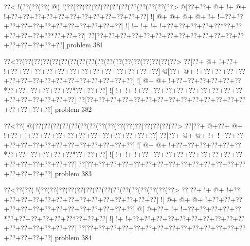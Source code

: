 \vbox{\vbox{\goo
\0??<\- !(\0??(\0??(\0??(\- @(\- !(\0??(\0??(\0??(\0??(\0??(\0??(\0??(\0??(\0??(\0??(\0??(\0??>
\- @[\0??+\0??+\- @+\- !+\- @+\- !+\0??+\0??+\0??+\0??+\0??+\0??+\0??+\0??+\0??+\0??+\0??+\0??]
\- ![\- @+\- @+\- @+\- @+\- !+\- !+\0??+\0??+\0??+\0??+\0??+\0??+\0??+\0??+\0??+\0??+\0??+\0??]
\- ![\- !+\- !+\- !+\- !+\0??+\0??+\0??+\0??+\0??*\0??+\0??+\0??+\0??+\0??+\0??*\0??+\0??+\0??]
\0??[\0??+\0??+\0??+\0??+\0??+\0??+\0??+\0??+\0??+\0??+\0??+\0??+\0??+\0??+\0??+\0??+\0??+\0??]
}
\hfil problem 381\hfil\break
}



\vbox{\vbox{\goo
\0??<\0??(\0??(\0??(\0??(\0??(\0??(\0??(\0??(\0??(\0??(\0??(\0??(\0??(\0??(\0??(\0??(\0??(\0??>
\0??[\0??+\- @+\- !+\0??+\- !+\0??+\0??+\0??+\0??+\0??+\0??+\0??+\0??+\0??+\0??+\0??+\0??+\0??]
\- @[\0??+\- @+\- !+\0??+\0??+\0??+\0??+\0??+\0??+\0??+\0??+\0??+\0??+\0??+\0??+\0??+\0??+\0??]
\- ![\- @+\- @+\- !+\0??+\0??+\0??+\0??+\0??+\0??*\0??+\0??+\0??+\0??+\0??+\0??*\0??+\0??+\0??]
\- ![\- !+\- !+\- !+\0??+\0??+\0??+\0??+\0??+\0??+\0??+\0??+\0??+\0??+\0??+\0??+\0??+\0??+\0??]
\0??[\0??+\0??+\0??+\0??+\0??+\0??+\0??+\0??+\0??+\0??+\0??+\0??+\0??+\0??+\0??+\0??+\0??+\0??]
}
\hfil problem 382\hfil\break
}



\vbox{\vbox{\goo
\0??<\0??(\- @(\0??(\0??(\0??(\0??(\0??(\0??(\0??(\0??(\0??(\0??(\0??(\0??(\0??(\0??(\0??(\0??>
\0??[\0??+\- @+\0??+\- @+\- !+\0??+\- !+\0??+\0??+\0??+\0??+\0??+\0??+\0??+\0??+\0??+\0??+\0??]
\0??[\0??+\- @+\- @+\- !+\- !+\0??+\0??+\0??+\0??+\0??+\0??+\0??+\0??+\0??+\0??+\0??+\0??+\0??]
\- ![\- @+\- @+\- !+\0??+\0??+\0??+\0??+\0??+\0??*\0??+\0??+\0??+\0??+\0??+\0??*\0??+\0??+\0??]
\- ![\- !+\- !+\- !+\0??+\0??+\0??+\0??+\0??+\0??+\0??+\0??+\0??+\0??+\0??+\0??+\0??+\0??+\0??]
\0??[\0??+\0??+\0??+\0??+\0??+\0??+\0??+\0??+\0??+\0??+\0??+\0??+\0??+\0??+\0??+\0??+\0??+\0??]
}
\hfil problem 383\hfil\break
}



\vbox{\vbox{\goo
\0??<\0??(\0??(\- !(\0??(\0??(\0??(\0??(\0??(\0??(\0??(\0??(\0??(\0??(\0??(\0??(\0??(\0??(\0??>
\0??[\0??+\- !+\- @+\- !+\0??+\0??+\0??+\0??+\0??+\0??+\0??+\0??+\0??+\0??+\0??+\0??+\0??+\0??]
\- ![\- @+\- @+\- @+\- !+\0??+\0??+\0??+\0??+\0??+\0??+\0??+\0??+\0??+\0??+\0??+\0??+\0??+\0??]
\- @[\- @+\0??+\- !+\- !+\0??+\0??+\0??+\0??+\0??*\0??+\0??+\0??+\0??+\0??+\0??*\0??+\0??+\0??]
\- ![\- !+\- !+\0??+\0??+\0??+\0??+\0??+\0??+\0??+\0??+\0??+\0??+\0??+\0??+\0??+\0??+\0??+\0??]
\0??[\0??+\0??+\0??+\0??+\0??+\0??+\0??+\0??+\0??+\0??+\0??+\0??+\0??+\0??+\0??+\0??+\0??+\0??]
}
\hfil problem 384\hfil\break
}



